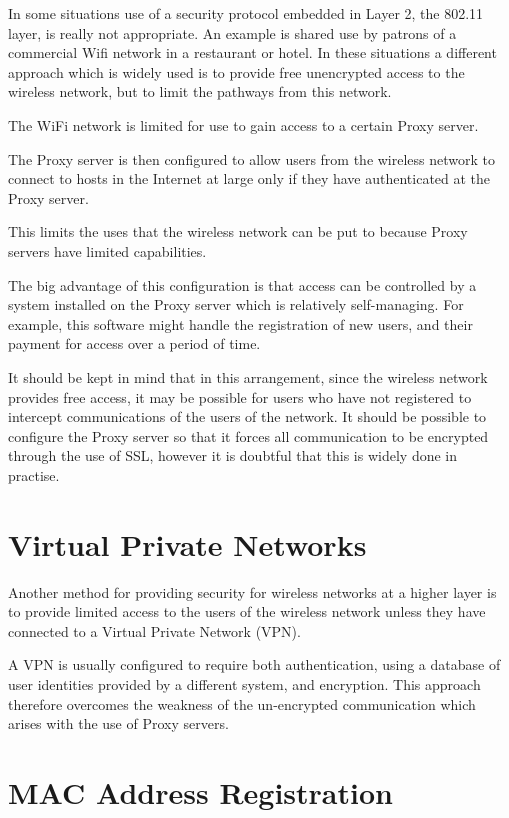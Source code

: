 In some situations use of a security protocol embedded in Layer 2, the 802.11 layer, is really not appropriate. An example is shared use by patrons of a commercial Wifi network in a restaurant or hotel. In these situations a different approach which is widely used is to provide free unencrypted access to the wireless network, but to limit the pathways from this network.

The WiFi network is limited for use to gain access to a certain Proxy server.

The Proxy server is then configured to allow users from the wireless network to connect to hosts in the Internet at large only if they have authenticated at the Proxy server. 

This limits the uses that the wireless network can be put to because Proxy servers have limited capabilities.

The big advantage of this configuration is that access can be controlled by a system installed on the Proxy server which is relatively self-managing. For example, this software might handle the registration of new users, and their payment for access over a period of time.

It should be kept in mind that in this arrangement, since the wireless network provides free access, it may be possible for users who have not registered to intercept communications of the users of the network. It should be possible to configure the Proxy server so that it forces all communication to be encrypted through the use of SSL, however it is doubtful that this is widely done in practise.

\section{Virtual Private Networks}

Another method for providing security for wireless networks at a higher layer is to provide limited access to the users of the wireless network unless they have connected to a Virtual Private Network (VPN). 

A VPN is usually configured to require both authentication, using a database of user identities provided by a different system, and encryption. This approach therefore overcomes the weakness of the un-encrypted communication which arises with the
use of Proxy servers.

\section{MAC Address Registration}

